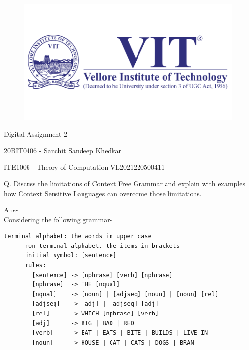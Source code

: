 \documentclass[12pt]{article}
\begin{document}
\begin{titlepage}
\NoBgThispage
   \begin{center}
        \begin{figure}[h] %
        \centering
        \includegraphics[width=15cm]{1583124354phpJTtnK5.png}
        \end{figure}

        \Huge{Digital Assignment 2}

        \vspace{0.5cm}
        \LARGE{20BIT0406 - Sanchit Sandeep Khedkar}
       
        \vspace{2.5 cm}

        \vspace{0.25 cm}
        \Large{ITE1006 - Theory of Computation}
        \large{VL2021220500411}
       

       \vfill
    \end{center}
\end{titlepage}
\newpage
Q. Discuss the limitations of Context Free Grammar and explain with examples how Context Sensitive
Languages can overcome those limitations.
\par
Ans-\\
Considering the following grammar-
\begin{verbatim}
terminal alphabet: the words in upper case
      non-terminal alphabet: the items in brackets
      initial symbol: [sentence]
      rules:
        [sentence] -> [nphrase] [verb] [nphrase]
        [nphrase]  -> THE [nqual]
        [nqual]    -> [noun] | [adjseq] [noun] | [noun] [rel]
        [adjseq]   -> [adj] | [adjseq] [adj]
        [rel]      -> WHICH [nphrase] [verb]
        [adj]      -> BIG | BAD | RED
        [verb]     -> EAT | EATS | BITE | BUILDS | LIVE IN
        [noun]     -> HOUSE | CAT | CATS | DOGS | BRAN
\end{verbatim}
\end{document}
